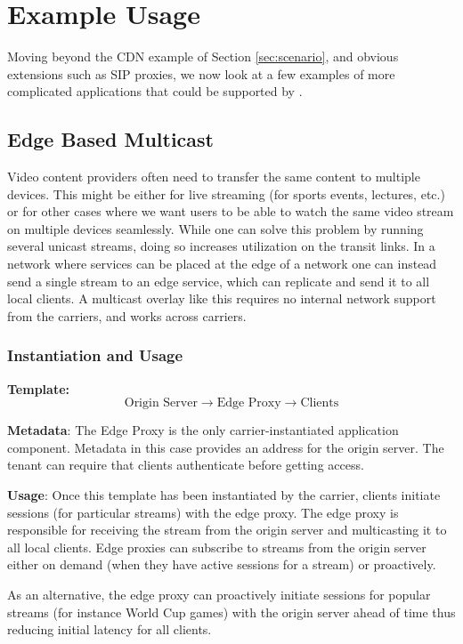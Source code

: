 \section{Example Usage}
\label{sec:example}

Moving beyond the CDN example of Section \ref{sec:scenario}, and obvious extensions such as SIP proxies, we now look at a few examples of more complicated applications that could be supported by \name.

\subsection{Edge Based Multicast}

Video content providers often need to transfer the same content to multiple devices. This might be either for live streaming (for sports events, lectures, etc.) or for other cases where we want users to be able to watch the same video stream on multiple devices seamlessly. While one can solve this problem by running several unicast streams, doing so increases utilization on the transit links.  
In a network where services can be placed at the edge of a network one can instead send a single stream to an edge service, which can replicate and send it to all local clients. A multicast overlay like this requires no internal network support from the carriers, and works across carriers. 

\subsubsection*{Instantiation and Usage}
\indent\indent\textbf{Template:} $$\text{Origin Server} \rightarrow \text{Edge Proxy} \rightarrow \text{Clients}$$

\textbf{Metadata}: The Edge Proxy is the only carrier-instantiated application component. Metadata in this case provides an address for the origin server. The tenant can require that clients authenticate before getting access.

\textbf{Usage}: Once this template has been instantiated by the carrier, clients initiate sessions (for particular streams) with the edge proxy. The edge proxy is responsible for receiving the stream from the origin server and multicasting it to all local clients. 
Edge proxies can subscribe to streams from the origin server either on demand (\ie when they have active sessions for a stream) or proactively.

As an alternative, the edge proxy can proactively initiate sessions for popular streams (for instance World Cup games) with the origin server ahead of time thus reducing initial latency for all clients.

